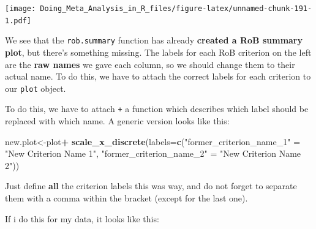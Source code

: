 \documentclass[]{book}
\newenvironment{Shaded}{\begin{snugshade}}{\end{snugshade}}
\newcommand{\DataTypeTok}[1]{\textcolor[rgb]{0.13,0.29,0.53}{#1}}
\newcommand{\KeywordTok}[1]{\textcolor[rgb]{0.13,0.29,0.53}{\textbf{#1}}}
\newcommand{\NormalTok}[1]{#1}
\newcommand{\OperatorTok}[1]{\textcolor[rgb]{0.81,0.36,0.00}{\textbf{#1}}}
\newcommand{\StringTok}[1]{\textcolor[rgb]{0.31,0.60,0.02}{#1}}
\begin{document}
\texttt{[image: Doing\_Meta\_Analysis\_in\_R\_files/figure-latex/unnamed-chunk-191-1.pdf]}

We see that the \texttt{rob.summary} function has already \textbf{created a RoB summary plot}, but there's something missing. The labels for each RoB criterion on the left are the \textbf{raw names} we gave each column, so we should change them to their actual name. To do this, we have to attach the correct labels for each criterion to our \texttt{plot} object.

To do this, we have to attach \texttt{+} a function which describes which label should be replaced with which name. A generic version looks like this:

\begin{Shaded}
\begin{Highlighting}[]
\NormalTok{new.plot<-plot}\OperatorTok{+}
\StringTok{  }\KeywordTok{scale_x_discrete}\NormalTok{(}\DataTypeTok{labels=}\KeywordTok{c}\NormalTok{(}\StringTok{"former_criterion_name_1"}\NormalTok{ =}\StringTok{ "New Criterion Name 1"}\NormalTok{, }
                            \StringTok{"former_criterion_name_2"}\NormalTok{ =}\StringTok{ "New Criterion Name 2"}\NormalTok{))}
\end{Highlighting}
\end{Shaded}

Just define \textbf{all} the criterion labels this was way, and do not forget to separate them with a comma within the bracket (except for the last one).

If i do this for my data, it looks like this:
\end{document}
